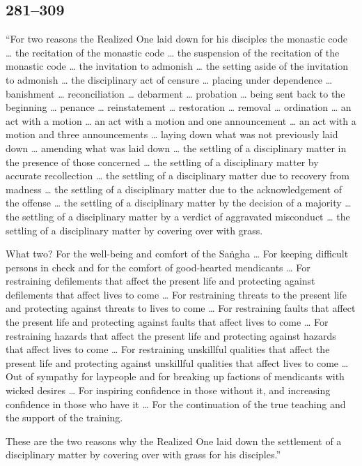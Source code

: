 \documentclass[12pt,openany]{book}%
\begin{document}
\subsection*{281–309 }

“For two reasons the Realized One laid down for his disciples the monastic code … the recitation of the monastic code … the suspension of the recitation of the monastic code … the invitation to admonish … the setting aside of the invitation to admonish … the disciplinary act of censure … placing under dependence … banishment … reconciliation … debarment … probation … being sent back to the beginning … penance … reinstatement … restoration … removal … ordination … an act with a motion … an act with a motion and one announcement … an act with a motion and three announcements … laying down what was not previously laid down … amending what was laid down … the settling of a disciplinary matter in the presence of those concerned … the settling of a disciplinary matter by accurate recollection … the settling of a disciplinary matter due to recovery from madness … the settling of a disciplinary matter due to the acknowledgement of the offense … the settling of a disciplinary matter by the decision of a majority … the settling of a disciplinary matter by a verdict of aggravated misconduct … the settling of a disciplinary matter by covering over with grass. 

What two? For the well-being and comfort of the \textsanskrit{Saṅgha} … For keeping difficult persons in check and for the comfort of good-hearted mendicants … For restraining defilements that affect the present life and protecting against defilements that affect lives to come … For restraining threats to the present life and protecting against threats to lives to come … For restraining faults that affect the present life and protecting against faults that affect lives to come … For restraining hazards that affect the present life and protecting against hazards that affect lives to come … For restraining unskillful qualities that affect the present life and protecting against unskillful qualities that affect lives to come … Out of sympathy for laypeople and for breaking up factions of mendicants with wicked desires … For inspiring confidence in those without it, and increasing confidence in those who have it … For the continuation of the true teaching and the support of the training. 

These are the two reasons why the Realized One laid down the settlement of a disciplinary matter by covering over with grass for his disciples.” 
\end{document}
